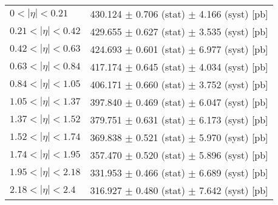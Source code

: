 \begin{tabular}{lc}
\hline
$0 < |\eta| <0.21$             & 430.124 $\pm$ 0.706 (stat) $\pm$ 4.166 (syst) [pb]  \\
$0.21 < |\eta| <0.42$          & 429.655 $\pm$ 0.627 (stat) $\pm$ 3.535 (syst) [pb]  \\
$0.42 < |\eta| <0.63$          & 424.693 $\pm$ 0.601 (stat) $\pm$ 6.977 (syst) [pb]  \\
$0.63 < |\eta| <0.84$          & 417.174 $\pm$ 0.645 (stat) $\pm$ 4.034 (syst) [pb]  \\
$0.84 < |\eta| <1.05$          & 406.171 $\pm$ 0.660 (stat) $\pm$ 3.752 (syst) [pb]  \\
$1.05 < |\eta| <1.37$          & 397.840 $\pm$ 0.469 (stat) $\pm$ 6.047 (syst) [pb]  \\
$1.37 < |\eta| <1.52$          & 379.751 $\pm$ 0.631 (stat) $\pm$ 6.173 (syst) [pb]  \\
$1.52 < |\eta| <1.74$          & 369.838 $\pm$ 0.521 (stat) $\pm$ 5.970 (syst) [pb]  \\
$1.74 < |\eta| <1.95$          & 357.470 $\pm$ 0.520 (stat) $\pm$ 5.896 (syst) [pb]  \\
$1.95 < |\eta| <2.18$          & 331.953 $\pm$ 0.466 (stat) $\pm$ 6.689 (syst) [pb]  \\
$2.18 < |\eta| <2.4$           & 316.927 $\pm$ 0.480 (stat) $\pm$ 7.642 (syst) [pb]  \\
\hline
\end{tabular}
